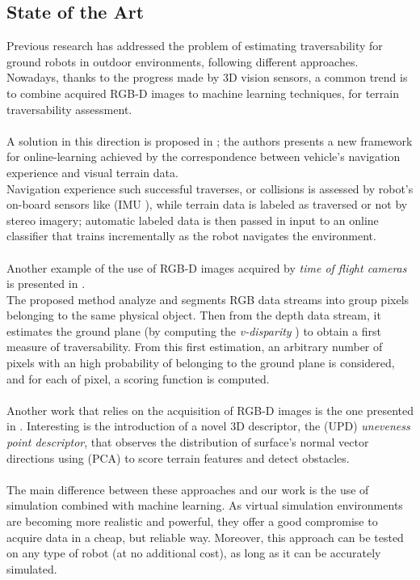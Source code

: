 \documentclass[]{usiinfbachelorproject}
\begin{document}
\subsection{State of the Art}
Previous research has addressed the problem of estimating traversability for ground robots in outdoor environments, following different approaches.\\
Nowadays, thanks to the progress made by 3D vision sensors, a common trend is to combine acquired RGB-D images to machine learning techniques, for terrain traversability assessment.\\\\
A solution in this direction is proposed in \cite{Kim}; the authors presents a new framework for online-learning achieved by the correspondence between vehicle's navigation experience and
visual terrain data. \\
Navigation experience such successful traverses, or collisions is assessed by robot's on-board sensors like (IMU \cite{imu}), while terrain data is labeled as traversed or not
by stereo imagery; automatic labeled data is then passed in input to an online classifier that trains incrementally as the robot navigates the environment. \\\\
Another example of the use of RGB-D images acquired by \textit{time of flight cameras} is presented in \cite{tofc}. \\
The proposed method analyze and segments RGB data streams into group pixels
belonging to the same physical object. Then from the depth data stream, it estimates the ground plane (by computing the \textit{v-disparity} \cite{raphael}) to obtain a first measure of
traversability. From this first estimation, an arbitrary number of pixels with an high probability of belonging to the ground plane is considered, and for each of pixel, a scoring function is computed.\\\\
Another work that relies on the acquisition of RGB-D images is the one presented in \cite{bellone}. Interesting is the introduction of a novel 3D descriptor, the (UPD) \textit{uneveness point descriptor},
that observes the distribution of surface's normal vector directions using (PCA) \cite{pca} to score terrain features and detect obstacles.\\\\
The main difference between these approaches and our work is the use of simulation combined with machine learning. As virtual simulation environments are becoming more realistic and powerful,
they offer a good compromise to acquire data in a cheap, but reliable way. Moreover, this approach can be tested on any type of robot (at no additional cost), as long as it can be
accurately simulated.
\end{document}
